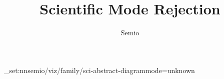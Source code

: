\documentclass[type=paper,language=en,theme=light]{semio}
\title{Scientific Mode Rejection}
\author{Semio}
\date{}
\begin{document}
\SemioVizProbePage
\ExplSyntaxOn\keys_set:nn{semio/viz/family/sci-abstract-diagram}{mode=unknown}\ExplSyntaxOff
{}
\SemioVizProbeEnd
\end{document}
